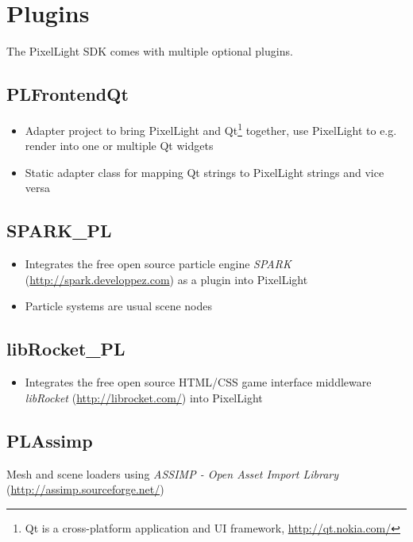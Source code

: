 \chapter{Plugins}
The PixelLight SDK comes with multiple optional plugins.




\section{PLFrontendQt}
\begin{itemize}
\item{Adapter project to bring PixelLight and Qt\footnote{Qt is a cross-platform application and UI framework, \url{http://qt.nokia.com/}} together, use PixelLight to e.g. render into one or multiple Qt widgets}
\item{Static adapter class for mapping Qt strings to PixelLight strings and vice versa}
\end{itemize}




\section{SPARK\_PL}
\begin{itemize}
\item{Integrates the free open source particle engine \emph{SPARK} (\url{http://spark.developpez.com}) as a plugin into PixelLight}
\item{Particle systems are usual scene nodes}
\end{itemize}




\section{libRocket\_PL}
\begin{itemize}
\item{Integrates the free open source HTML/CSS game interface middleware \emph{libRocket} (\url{http://librocket.com/}) into PixelLight}
\end{itemize}




\section{PLAssimp}
Mesh and scene loaders using \emph{ASSIMP - Open Asset Import Library} (\url{http://assimp.sourceforge.net/})




